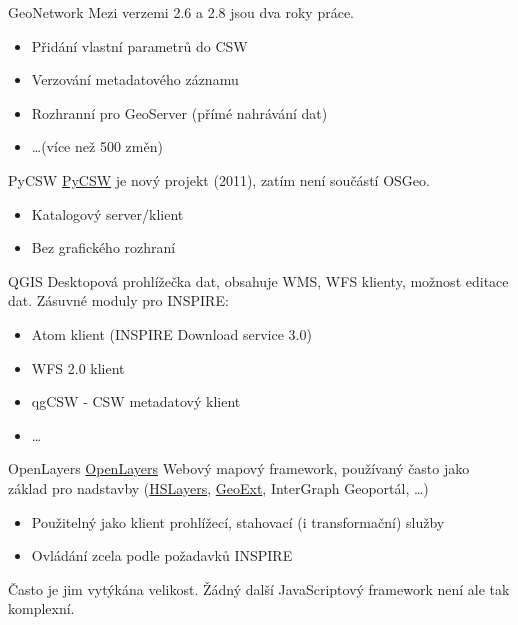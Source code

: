 \documentclass[xcolor=dvipsnames]{beamer}
\begin{document}
\begin{frame}{GeoNetwork}
Mezi verzemi 2.6 a 2.8 jsou dva roky práce.
    \begin{itemize}
        \item Přidání vlastní parametrů do CSW
        \item Verzování metadatového záznamu
        \item Rozhranní pro GeoServer (přímé nahrávání dat)
        \item \dots (více než 500 změn)
    \end{itemize}
\end{frame}

\begin{frame}{PyCSW}
    \href{http://pycsw.org}{PyCSW} je nový projekt (2011), zatím není součástí OSGeo. 
    \begin{itemize}
        \item Katalogový server/klient
        \item Bez grafického rozhraní
    \end{itemize}
\end{frame}

\begin{frame}{QGIS}
    Desktopová prohlížečka dat, obsahuje WMS, WFS klienty, možnost editace dat.
    Zásuvné moduly pro INSPIRE:
    \begin{itemize}
        \item Atom klient (INSPIRE Download service 3.0)
        \item WFS 2.0 klient
        \item qgCSW - CSW metadatový klient
        \item \dots
    \end{itemize}
\end{frame}

\begin{frame}{OpenLayers}
    \href{http://openlayers.org}{OpenLayers} Webový mapový framework, používaný
    často jako základ pro nadstavby (\href{http://hslayers.org}{HSLayers},
    \href{http://geoext.org}{GeoExt}, InterGraph Geoportál, \dots)

    \begin{itemize}
        \item Použitelný jako klient prohlížecí, stahovací (i transformační) služby
        \item Ovládání zcela podle požadavků INSPIRE
    \end{itemize}

    Často je jim vytýkána velikost. Žádný další JavaScriptový framework není ale
    tak komplexní.
\end{frame}
\end{document}
